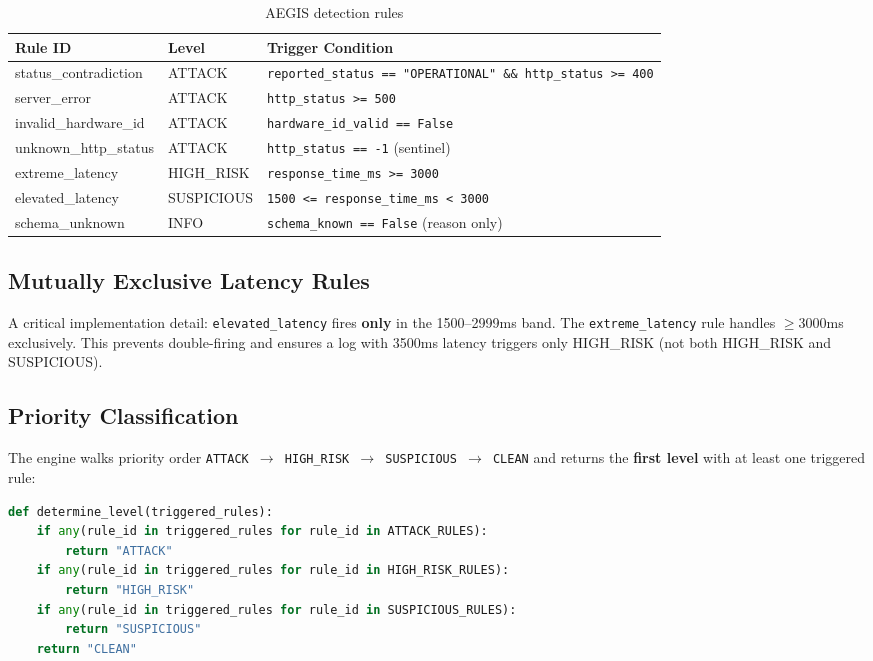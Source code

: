 \documentclass[12pt,a4paper]{article}
\begin{document}
\begin{table}[H]
\centering
\begin{tabularx}{\linewidth}{>{\ttfamily}l l X}
\toprule
Rule ID & Level & Trigger Condition \\
\midrule
status\_contradiction & ATTACK & \texttt{reported\_status == "OPERATIONAL" \&\& http\_status >= 400} \\
server\_error & ATTACK & \texttt{http\_status >= 500} \\
invalid\_hardware\_id & ATTACK & \texttt{hardware\_id\_valid == False} \\
unknown\_http\_status & ATTACK & \texttt{http\_status == -1} (sentinel) \\
extreme\_latency & HIGH\_RISK & \texttt{response\_time\_ms >= 3000} \\
elevated\_latency & SUSPICIOUS & \texttt{1500 <= response\_time\_ms < 3000} \\
schema\_unknown & INFO & \texttt{schema\_known == False} (reason only) \\
\bottomrule
\end{tabularx}
\caption{AEGIS detection rules}
\end{table}

\subsection{Mutually Exclusive Latency Rules}

A critical implementation detail: \texttt{elevated\_latency} fires \textbf{only} in the 1500--2999ms band. The \texttt{extreme\_latency} rule handles $\geq$3000ms exclusively. This prevents double-firing and ensures a log with 3500ms latency triggers only HIGH\_RISK (not both HIGH\_RISK and SUSPICIOUS).

\subsection{Priority Classification}

The engine walks priority order \texttt{ATTACK $\rightarrow$ HIGH\_RISK $\rightarrow$ SUSPICIOUS $\rightarrow$ CLEAN} and returns the \textbf{first level} with at least one triggered rule:

\begin{lstlisting}[language=Python, caption={Priority determination logic}]
def determine_level(triggered_rules):
    if any(rule_id in triggered_rules for rule_id in ATTACK_RULES):
        return "ATTACK"
    if any(rule_id in triggered_rules for rule_id in HIGH_RISK_RULES):
        return "HIGH_RISK"
    if any(rule_id in triggered_rules for rule_id in SUSPICIOUS_RULES):
        return "SUSPICIOUS"
    return "CLEAN"
\end{lstlisting}
\end{document}
